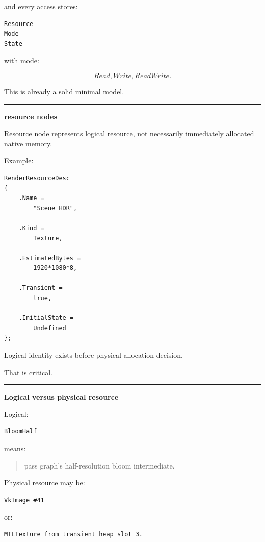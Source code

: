 and every access stores:

\begin{verbatim}
Resource
Mode
State
\end{verbatim}

with mode:

\[
Read,
Write,
ReadWrite.
\]

This is already a solid minimal model.

\begin{center}\rule{0.5\linewidth}{0.5pt}\end{center}

\textbf{resource nodes}

Resource node represents logical resource, not necessarily immediately allocated native memory.

Example:

\begin{verbatim}
RenderResourceDesc
{
    .Name =
        "Scene HDR",

    .Kind =
        Texture,

    .EstimatedBytes =
        1920*1080*8,

    .Transient =
        true,

    .InitialState =
        Undefined
};
\end{verbatim}

Logical identity exists before physical allocation decision.

That is critical.

\begin{center}\rule{0.5\linewidth}{0.5pt}\end{center}

\textbf{Logical versus physical resource}

Logical:

\begin{verbatim}
BloomHalf
\end{verbatim}

means:

\begin{quote}
pass graph's half-resolution bloom intermediate.
\end{quote}

Physical resource may be:

\begin{verbatim}
VkImage #41
\end{verbatim}

or:

\begin{verbatim}
MTLTexture from transient heap slot 3.
\end{verbatim}

